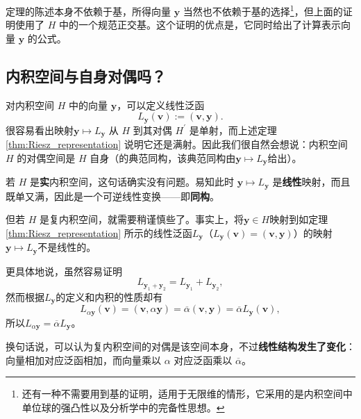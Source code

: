 \begin{remark*}
    定理的陈述本身不依赖于基，所得向量 $\mathbf{y}$ 当然也不依赖于基的选择\footnote{还有一种不需要用到基的证明，适用于无限维的情形，它采用的是内积空间中单位球的强凸性以及分析学中的完备性思想。}，但上面的证明使用了 $H$ 中的一个规范正交基。这个证明的优点是，它同时给出了计算表示向量 $\mathbf{y}$ 的公式。
\end{remark*}

\subsection{内积空间与自身对偶吗？}

对内积空间 $H$ 中的向量 $\mathbf{y}$，可以定义线性泛函
\[
    L_{\mathbf{y}}(\mathbf{v})
    :=(\mathbf{v},\mathbf{y}).
\]
很容易看出映射$\mathbf{y}\mapsto L_{\mathbf{y}}$
从 $H$ 到其对偶 $H^\prime$ 是单射，而上述定理 \ref{thm:Riesz_representation} 说明它还是满射。因此我们很自然会想说：内积空间 $H$ 的对偶空间是 $H$ 自身（的典范同构，该典范同构由$\mathbf{y}\mapsto L_{\mathbf{y}}$给出）。

若 $H$ 是{\bf 实}内积空间，这句话确实没有问题。易知此时
$\mathbf{y}\mapsto L_{\mathbf{y}}$ 是{\bf 线性}映射，而且既单又满，因此是一个可逆线性变换——即{\bf 同构}。

但若 $H$ 是复内积空间，就需要稍谨慎些了。事实上，将$\mathbf{y}\in H$映射到如定理 \ref{thm:Riesz_representation} 
所示的线性泛函$L_\mathbf{y}$（$L_{\mathbf{y}}(\mathbf{v})=(\mathbf{v},\mathbf{y})$）的映射$\mathbf{y}\mapsto L_{\mathbf{y}}$不是线性的。

更具体地说，虽然容易证明
\begin{equation}
    L_{\mathbf{y}_1+\mathbf{y}_2}
    =L_{\mathbf{y}_1}+L_{\mathbf{y}_2},
\end{equation}
然而根据$L_{\mathbf{y}}$的定义和内积的性质却有
\begin{equation}
    L_{\alpha\mathbf{y}}(\mathbf{v})
    =(\mathbf{v},\alpha\mathbf{y})
    =\overline{\alpha}(\mathbf{v},\mathbf{y})
    =\overline{\alpha}L_{\mathbf{y}}(\mathbf{v}),
\end{equation}
所以$L_{\alpha\mathbf{y}}=\overline{\alpha}L_{\mathbf{y}}$。

换句话说，可以认为复内积空间的对偶是该空间本身，不过{\bf 线性结构发生了变化}：向量相加对应泛函相加，而向量乘以 $\alpha$ 对应泛函乘以 $\overline{\alpha}$。

\begin{center}
\end{center}

